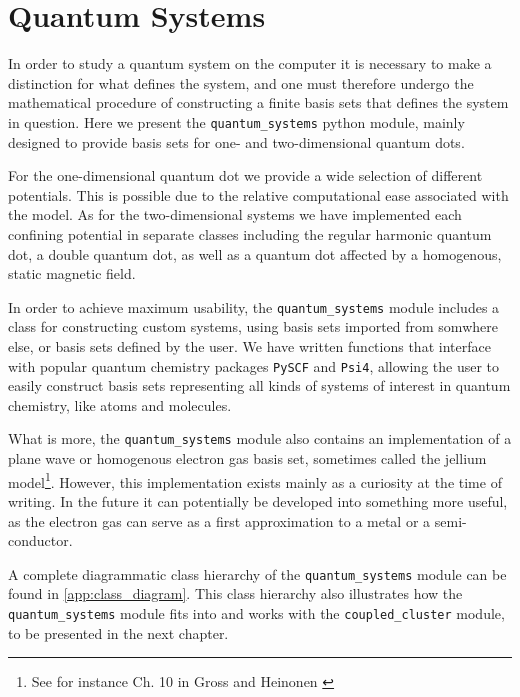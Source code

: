 \chapter{Quantum Systems}
\label{ch:impl_quantum_systems}

In order to study a quantum system on the computer it is necessary to 
make a distinction for what defines the system, and one must therefore undergo the
mathematical procedure of constructing a finite basis sets that defines the system in 
question. Here we present the \lstinline{quantum_systems} python module, mainly designed to 
provide basis sets for one- and two-dimensional quantum dots.

For the one-dimensional quantum dot we provide a wide selection of different
potentials. This is possible due to the relative computational ease associated with the 
model. As for the two-dimensional 
systems we have implemented each confining potential in separate classes including
the regular harmonic quantum dot, a 
double quantum dot, as well as a quantum dot affected by a homogenous, static  magnetic 
field.

In order to achieve maximum usability, the \lstinline{quantum_systems} module
includes a class for constructing custom systems, using basis sets imported from 
somwhere else, or basis sets defined by the user.
We have written functions that interface with popular quantum chemistry packages
\lstinline{PySCF}\cite{PYSCF} 
and \lstinline{Psi4}\cite{parrish2017psi4},
allowing the user to easily construct basis sets 
representing all kinds of systems of interest in quantum chemistry, like atoms and 
molecules. 

What is more, the \lstinline{quantum_systems} module also contains an implementation of 
a plane wave or homogenous electron gas basis set, sometimes called the 
jellium 
model\footnote{See for instance Ch. 10 in Gross and Heinonen \cite{gross1986many}}.
However, this implementation exists mainly as 
a curiosity at the time of writing. In the future it can potentially
be developed into something more useful,
as the electron gas can serve as a first approximation to a metal or a semi-conductor.

A complete diagrammatic class hierarchy of the \lstinline{quantum_systems} module 
can be found in \autoref{app:class_diagram}. This class hierarchy also illustrates how 
the \lstinline{quantum_systems} module fits into and works with the 
\lstinline{coupled_cluster} module, to be presented in the next chapter.

